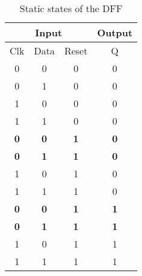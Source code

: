 \begin{table}[H]
    \centering
    \caption{Static states of the DFF}
    \label{tab:static_states}
    \begin{tabular}{cccc}
        \hline
        \multicolumn{3}{c}{Input}                                 & Output                          \\ \hline
        Clk                             & Data       & Reset      & Q                               \\ \hline
        0                               & 0          & 0          & 0                               \\
        0                               & 1          & 0          & 0                               \\
        1                               & 0          & 0          & 0                               \\
        1                               & 1          & 0          & 0                               \\ \hline
        \multicolumn{1}{|c}{\textbf{0}} & \textbf{0} & \textbf{1} & \multicolumn{1}{c|}{\textbf{0}} \\ \hline
        \multicolumn{1}{|c}{\textbf{0}} & \textbf{1} & \textbf{1} & \multicolumn{1}{c|}{\textbf{0}} \\ \hline
        1                               & 0          & 1          & 0                               \\
        1                               & 1          & 1          & 0                               \\ \hline
        \multicolumn{1}{|c}{\textbf{0}} & \textbf{0} & \textbf{1} & \multicolumn{1}{c|}{\textbf{1}} \\ \hline
        \multicolumn{1}{|c}{\textbf{0}} & \textbf{1} & \textbf{1} & \multicolumn{1}{c|}{\textbf{1}} \\ \hline
        1                               & 0          & 1          & 1                               \\
        1                               & 1          & 1          & 1                              
        \end{tabular}
\end{table}

